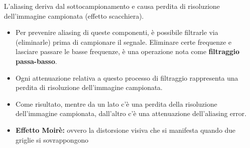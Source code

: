 
L’aliasing deriva dal sottocampionamento e causa perdita di
risoluzione dell’immagine campionata (effetto scacchiera).


\begin{itemize}
    \item Per prevenire aliasing di queste componenti, è possibile
          filtrarle via (eliminarle) prima di campionare il segnale.
          Eliminare certe frequenze e lasciare passare le basse frequenze,
          è una operazione nota come \textbf{filtraggio passa-basso}.
    \item Ogni attenuazione relativa a questo processo di filtraggio
          rappresenta una perdita di risoluzione dell’immagine
          campionata.
    \item Come risultato, mentre da un lato c’è una perdita della
          risoluzione dell’immagine campionata, dall’altro c’è una
          attenuazione dell’aliasing error.
    \item \textbf{Effetto Moirè:} ovvero la distorsione visiva che si manifesta quando due
          griglie si sovrappongono
\end{itemize}
